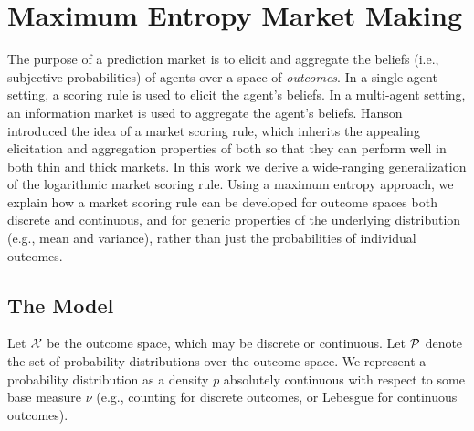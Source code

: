 
\section{Maximum Entropy Market Making}


The purpose of a prediction market is to elicit and aggregate the beliefs (i.e., subjective probabilities) of agents over a space of \emph{outcomes}. In a single-agent setting, a scoring rule is used to elicit the agent's beliefs. In a multi-agent setting, an information market is used to aggregate the agent's beliefs. Hanson~\cite{} introduced the idea of a market scoring rule, which inherits the appealing elicitation and aggregation properties of both so that they can perform well in both thin and thick markets. In this work we derive a wide-ranging generalization of the logarithmic market scoring rule. Using a maximum entropy approach, we explain how a market scoring rule can be developed for outcome spaces both discrete and continuous, and for generic properties of the underlying distribution (e.g., mean and variance), rather than just the probabilities of individual outcomes. 


\subsection{The Model}
\label{model}

Let $\mathcal{X}$ be the outcome space, which may be discrete or continuous. Let $\mathcal{P}$ denote the set of probability distributions over the outcome space. We represent a probability distribution as a density $p$ absolutely continuous with respect to some base measure $\nu$ (e.g., counting for discrete outcomes, or Lebesgue for continuous outcomes).%

